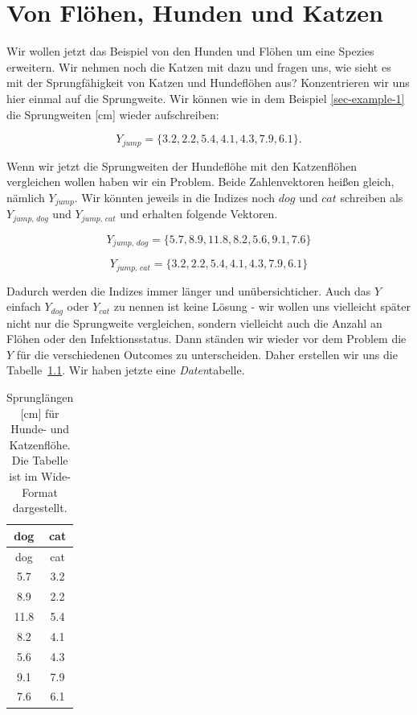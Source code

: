\documentclass[
  letterpaper,
  DIV=11,
  oneside]{scrreport}
\begin{document}
\hypertarget{sec-example-2}{%
\chapter{Von Flöhen, Hunden und Katzen}\label{sec-example-2}}

Wir wollen jetzt das Beispiel von den Hunden und Flöhen um eine Spezies
erweitern. Wir nehmen noch die Katzen mit dazu und fragen uns, wie sieht
es mit der Sprungfähigkeit von Katzen und Hundeflöhen aus? Konzentrieren
wir uns hier einmal auf die Sprungweite. Wir können wie in dem Beispiel
\ref{sec-example-1} die Sprungweiten {[}cm{]} wieder aufschreiben:

\[
Y_{jump} = \{3.2, 2.2, 5.4, 4.1, 4.3, 7.9, 6.1\}.
\]

Wenn wir jetzt die Sprungweiten der Hundeflöhe mit den Katzenflöhen
vergleichen wollen haben wir ein Problem. Beide Zahlenvektoren heißen
gleich, nämlich \(Y_{jump}\). Wir könnten jeweils in die Indizes noch
\(dog\) und \(cat\) schreiben als \(Y_{jump,\, dog}\) und
\(Y_{jump,\, cat}\) und erhalten folgende Vektoren.

\[
Y_{jump,\, dog} = \{5.7, 8.9, 11.8, 8.2, 5.6, 9.1, 7.6\}
\]

\[
Y_{jump,\, cat} = \{3.2, 2.2, 5.4, 4.1, 4.3, 7.9, 6.1\}
\]

Dadurch werden die Indizes immer länger und unübersichticher. Auch das
\(Y\) einfach \(Y_{dog}\) oder \(Y_{cat}\) zu nennen ist keine Lösung -
wir wollen uns vielleicht später nicht nur die Sprungweite vergleichen,
sondern vielleicht auch die Anzahl an Flöhen oder den Infektionsstatus.
Dann ständen wir wieder vor dem Problem die \(Y\) für die verschiedenen
Outcomes zu unterscheiden. Daher erstellen wir uns die
Tabelle~\ref{tbl-dog-cat-wide}. Wir haben jetzte eine
\emph{Daten}tabelle.

\hypertarget{tbl-dog-cat-wide}{}
\begin{longtable}[]{@{}cc@{}}
\caption{\label{tbl-dog-cat-wide}Sprunglängen {[}cm{]} für Hunde- und
Katzenflöhe. Die Tabelle ist im Wide-Format dargestellt.}\tabularnewline
\toprule()
dog & cat \\
\midrule()
\endfirsthead
\toprule()
dog & cat \\
\midrule()
\endhead
5.7 & 3.2 \\
8.9 & 2.2 \\
11.8 & 5.4 \\
8.2 & 4.1 \\
5.6 & 4.3 \\
9.1 & 7.9 \\
7.6 & 6.1 \\
\bottomrule()
\end{longtable}
\end{document}
